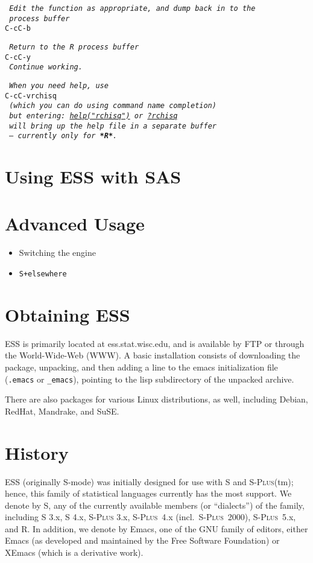 \documentclass{article}
\newcommand*{\Splus}{\textsc{S-Plus}}
\newcommand*{\Scmt}[1]{\hbox{\qquad {\footnotesize \#\#} \textsl{#1}}}
\newenvironment{Salltt}{\small\begin{alltt}}{\end{alltt}}
\begin{document}
\begin{itemize}
\begin{Salltt}
  \Scmt{Edit the function as appropriate, and dump back in to the}
  \Scmt{process buffer}
  C-c C-b

  \Scmt{Return to the R process buffer}
  C-c C-y
  \Scmt{Continue working.}

  \Scmt{When you need help, use}
  C-c C-v rchisq
  \Scmt{(which you can do using command name completion)}
  \Scmt{but entering:   \underline{help("rchisq")} or  \underline{?rchisq}}
  \Scmt{will bring up the help file in a separate buffer}
  \Scmt{\emph{--- currently only for \textbf{*R*}}.}
\end{Salltt}
\end{itemize}


\section{Using ESS with SAS}
\label{sec:SAS}



\section{Advanced Usage}
\label{sec:advanced}

\begin{itemize}
\item Switching the engine
\item \texttt{S+elsewhere}

\end{itemize}

\section{Obtaining ESS}
\label{sec:getIt}

ESS is primarily located at ess.stat.wisc.edu, and is available by FTP
or through the World-Wide-Web (WWW).  A basic installation consists of
downloading the package, unpacking, and then adding a line to the
emacs initialization file (\verb+.emacs+ or \verb+_emacs+), pointing
to the lisp subdirectory of the unpacked archive.

There are also packages for various Linux distributions, as well,
including Debian, RedHat, Mandrake, and SuSE.

\section{History}
\label{sec:history}

ESS (originally S-mode) was initially designed for use with S and
\Splus(tm); hence, this family of statistical languages currently has
the most support.  We denote by S, any of the currently available
members (or ``dialects'') of the family, including S 3.x, S 4.x, \Splus
3.x, \Splus~4.x (incl.\ \Splus~2000), \Splus~5.x, and R.  In addition, we
denote by Emacs, one of the GNU family of editors, either Emacs (as
developed and maintained by the Free Software Foundation) or XEmacs (which
is a derivative work).
\end{document}
